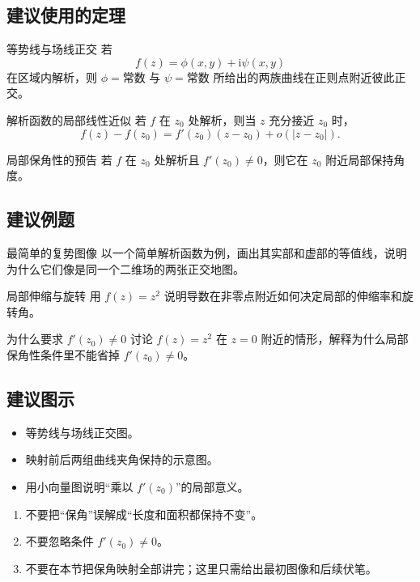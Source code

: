 \subsection*{建议使用的定理}
\begin{dingli}{等势线与场线正交}{}
若
\[
    f(z)=\phi(x,y)+\mathrm{i}\psi(x,y)
\]
在区域内解析，则 $\phi=\text{常数}$ 与 $\psi=\text{常数}$ 所给出的两族曲线在正则点附近彼此正交。
\end{dingli}

\begin{dingli}{解析函数的局部线性近似}{}
若 $f$ 在 $z_0$ 处解析，则当 $z$ 充分接近 $z_0$ 时，
\[
    f(z)-f(z_0)=f'(z_0)(z-z_0)+o(|z-z_0|).
\]
\end{dingli}

\begin{dingli}{局部保角性的预告}{}
若 $f$ 在 $z_0$ 处解析且 $f'(z_0)\neq 0$，则它在 $z_0$ 附近局部保持角度。
\end{dingli}

\subsection*{建议例题}
\begin{lizi}{最简单的复势图像}{}
以一个简单解析函数为例，画出其实部和虚部的等值线，说明为什么它们像是同一个二维场的两张正交地图。
\end{lizi}

\begin{lizi}{局部伸缩与旋转}{}
用 $f(z)=z^2$ 说明导数在非零点附近如何决定局部的伸缩率和旋转角。
\end{lizi}

\begin{lizi}{为什么要求 $f'(z_0)\neq 0$}{}
讨论 $f(z)=z^2$ 在 $z=0$ 附近的情形，解释为什么局部保角性条件里不能省掉 $f'(z_0)\neq 0$。
\end{lizi}

\subsection*{建议图示}
\begin{itemize}
    \item 等势线与场线正交图。
    \item 映射前后两组曲线夹角保持的示意图。
    \item 用小向量图说明``乘以 $f'(z_0)$''的局部意义。
\end{itemize}

\begin{jinshi}[本节易错点]
\begin{enumerate}
    \item 不要把``保角''误解成``长度和面积都保持不变''。
    \item 不要忽略条件 $f'(z_0)\neq 0$。
    \item 不要在本节把保角映射全部讲完；这里只需给出最初图像和后续伏笔。
\end{enumerate}
\end{jinshi}


